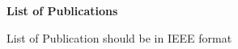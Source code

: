 \begin{center}
\begin{huge}
\bfseries{List of Publications}
\end{huge}
\end{center}
\noindent List of Publication should be in IEEE format
\pagebreak

